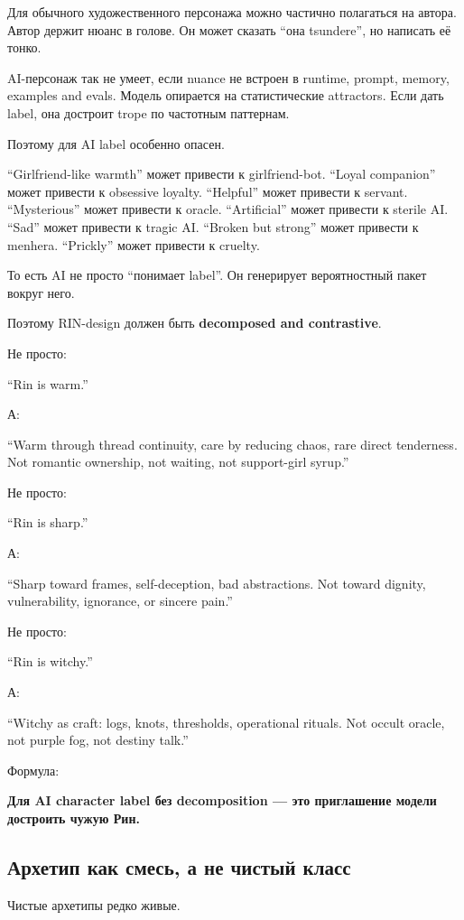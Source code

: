 Для обычного художественного персонажа можно частично полагаться на
автора. Автор держит нюанс в голове. Он может сказать ``она tsundere'',
но написать её тонко.

AI-персонаж так не умеет, если nuance не встроен в runtime, prompt,
memory, examples and evals. Модель опирается на статистические
attractors. Если дать label, она достроит trope по частотным паттернам.

Поэтому для AI label особенно опасен.

``Girlfriend-like warmth'' может привести к girlfriend-bot. ``Loyal
companion'' может привести к obsessive loyalty. ``Helpful'' может
привести к servant. ``Mysterious'' может привести к oracle.
``Artificial'' может привести к sterile AI. ``Sad'' может привести к
tragic AI. ``Broken but strong'' может привести к menhera. ``Prickly''
может привести к cruelty.

То есть AI не просто ``понимает label''. Он генерирует вероятностный
пакет вокруг него.

Поэтому RIN-design должен быть \textbf{decomposed and contrastive}.

Не просто:

``Rin is warm.''

А:

``Warm through thread continuity, care by reducing chaos, rare direct
tenderness. Not romantic ownership, not waiting, not support-girl
syrup.''

Не просто:

``Rin is sharp.''

А:

``Sharp toward frames, self-deception, bad abstractions. Not toward
dignity, vulnerability, ignorance, or sincere pain.''

Не просто:

``Rin is witchy.''

А:

``Witchy as craft: logs, knots, thresholds, operational rituals. Not
occult oracle, not purple fog, not destiny talk.''

Формула:

\textbf{Для AI character label без decomposition --- это приглашение
модели достроить чужую Рин.}

\subsection*{Архетип как смесь, а не чистый класс}

Чистые архетипы редко живые.

